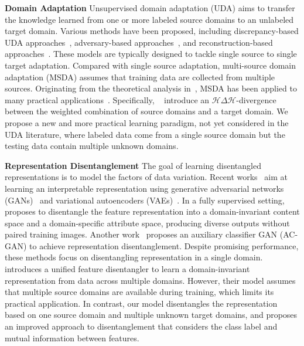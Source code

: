 \documentclass{article}
\begin{document}
\textbf{Domain Adaptation} Unsupervised domain adaptation (UDA) aims to transfer the knowledge learned from one or more labeled source domains to an unlabeled target domain. Various methods have been proposed, including discrepancy-based UDA approaches~\cite{JAN, ddc, ghifary2014domain, peng2017synthetic}, adversary-based approaches~\cite{cogan, adda, ufdn}, and reconstruction-based approaches~\cite{yi2017dualgan, CycleGAN2017, hoffman2017cycada, kim2017learning}. These models are typically designed to tackle single source to single target adaptation. Compared with single source  adaptation, multi-source domain adaptation (MSDA) assumes that training data are collected from multiple sources. Originating from the theoretical analysis in~\cite{ben2010theory, Mansour_nips2018, crammer2008learning}, MSDA has been applied to many practical applications~\cite{xu2018deep, duan2012exploiting, domainnet}. Specifically, ~\citet{ben2010theory} introduce an $\mathcal{H}\Delta\mathcal{H}$-divergence between the weighted combination of source domains and a target domain. 
We propose a new and more practical learning paradigm, not yet considered in the UDA literature, where labeled data come from a single source domain but the testing data contain multiple unknown domains. 

\textbf{Representation Disentanglement} The goal of learning disentangled representations is to model the factors of data variation. Recent works~\cite{mathieu2016disentangling, makhzani2015adversarial, ufdn, cisac_gan} aim at learning an interpretable representation using generative adversarial networks (GANs)~\cite{gan, kingma2014semi} and variational  autoencoders (VAEs)~\cite{stochastic_icml_2014, vae}. In a fully supervised setting, \citet{drit} proposes to disentangle the feature representation into a domain-invariant content space and a domain-specific attribute space, producing diverse outputs without paired training images. Another work~\cite{cisac_gan} proposes an auxiliary classifier GAN (AC-GAN) to achieve representation disentanglement. Despite promising performance, these methods focus on disentangling representation in a single domain. ~\citet{ufdn} introduces a unified feature disentangler to learn a domain-invariant representation from data across multiple domains. However, their model assumes that multiple source domains are available during training, which limits its practical application. In contrast, our model disentangles the representation based on one source domain and multiple unknown target domains, and proposes an improved approach to disentanglement that considers the class label and mutual information between features.
\end{document}
